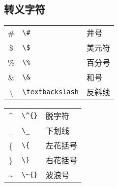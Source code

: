 \subsection{转义字符}
\begin{table}[h]
	\centering
	\begin{minipage}[t]{0.46\textwidth}
		\centering
		\begin{tabular}{c p{7em} p{5em}}
			\hline
			\#             & \verb|\#|             & 井号 \\
			\$             & \verb|\$|             & 美元符 \\
			\%             & \verb|\%|             & 百分号 \\
			\&             & \verb|\&|             & 和号 \\
			\textbackslash & \verb|\textbackslash| & 反斜线 \\
			\hline
		\end{tabular}
	\end{minipage}
	\qquad
	\begin{minipage}[t]{0.46\textwidth}
		\centering
		\begin{tabular}{c p{7em} p{5em}}
			\hline
			\^{}           & \verb|\^{}|           & 脱字符 \\
			\_             & \verb|\_|             & 下划线 \\
			\{             & \verb|\{|             & 左花括号 \\
			\}             & \verb|\}|             & 右花括号 \\
			\~{}           & \verb|\~{}|           & 波浪号 \\
			\hline
		\end{tabular}
	\end{minipage}
\end{table}

